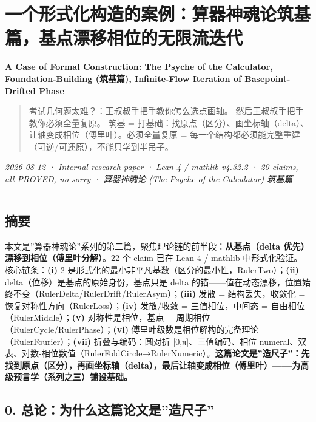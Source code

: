 \documentclass[
]{article}
\author{}
\date{}
\begin{document}
\section{一个形式化构造的案例：算器神魂论筑基篇，基点漂移相位的无限流迭代}\label{ux4e00ux4e2aux5f62ux5f0fux5316ux6784ux9020ux7684ux6848ux4f8bux7b97ux5668ux795eux9b42ux8bbaux7b51ux57faux7bc7ux57faux70b9ux6f02ux79fbux76f8ux4f4dux7684ux65e0ux9650ux6d41ux8fedux4ee3}

\textbf{A Case of Formal Construction: The Psyche of the Calculator,
Foundation-Building (筑基篇), Infinite-Flow Iteration of
Basepoint-Drifted Phase}

\begin{quote}
考试几何题太难？：王叔叔手把手教你怎么选点画轴。
然后王叔叔手把手教你必须全量复原。 筑基 =
打基础：找原点（区分）、画坐标轴（delta）、让轴变成相位（傅里叶）。必须全量复原
= 每一个结构都必须能完整重建（可逆/可还原），不能只学到半吊子。
\end{quote}

\emph{2026-08-12 · Internal research paper · Lean 4 / mathlib v4.32.2 ·
20 claims, all PROVED, no sorry · 算器神魂论 (The Psyche of the
Calculator) 筑基篇 }

\begin{center}\rule{0.5\linewidth}{0.5pt}\end{center}

\subsection{摘要}\label{ux6458ux8981}

本文是''算器神魂论''系列的第二篇，聚焦理论链的前半段：\textbf{从基点（delta
优先）漂移到相位（傅里叶分解）}。22 个 claim 已在 Lean 4 / mathlib
中形式化验证。核心链条：\textbf{(i)} 2
是形式化的最小非平凡基数（区分的最小性，RulerTwo）；\textbf{(ii)}
delta（位移）是基点的原始身份，基点只是 delta
的锚------值在动态漂移，位置始终不变（RulerDelta/RulerDrift/RulerAsym）；\textbf{(iii)}
发散 = 结构丢失，收敛化 = 恢复对称性方向（RulerLoss）；\textbf{(iv)}
发散/收敛 = 三值相位，中间态 = 自由相位（RulerMiddle）；\textbf{(v)}
对称性是相位，基点 = 周期相位（RulerCycle/RulerPhase）；\textbf{(vi)}
傅里叶级数是相位解构的完备理论（RulerFourier）；\textbf{(vii)}
折叠与编码：圆对折 {[}0,π{]}、三值编码、相位
numeral、双表、对数-相位数值（RulerFoldCircle→RulerNumeric）。\textbf{这篇论文是''造尺子''：先找到原点（区分），再画坐标轴（delta），最后让轴变成相位（傅里叶）------为高级预言学（系列之三）铺设基础。}

\subsection{0.
总论：为什么这篇论文是''造尺子''}\label{ux603bux8bbaux4e3aux4ec0ux4e48ux8fd9ux7bc7ux8bbaux6587ux662fux9020ux5c3aux5b50}
\end{document}
